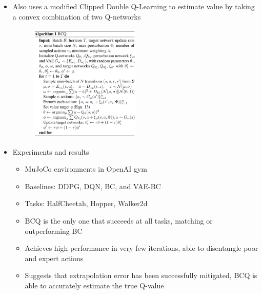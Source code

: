 \begin{itemize}
  \item Also uses a modified Clipped Double Q-Learning to estimate value by taking a convex combination of two Q-networks
  \begin{figure}[h]
    \centering
    \includegraphics[width=0.5\textwidth]{../../imgs/bcq.png}
  \end{figure}

  \item Experiments and results
  \begin{itemize}
    \item MuJoCo environments in OpenAI gym
    \item Baselines: DDPG, DQN, BC, and VAE-BC
    \item Tasks: HalfCheetah, Hopper, Walker2d
    \item BCQ is the only one that succeeds at all tasks, matching or outperforming BC
    \item Achieves high performance in very few iterations, able to disentangle poor and expert actions
    \item Suggests that extrapolation error has been successfully mitigated, BCQ is able to accurately estimate the true Q-value
  \end{itemize}

\end{itemize}